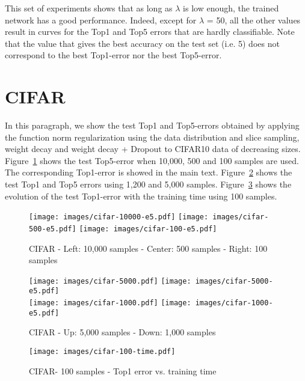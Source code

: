 \documentclass{article}
\begin{document}
This set of experiments shows that as long as $\lambda$ is low enough, the trained network has a good performance. Indeed, except for $\lambda$ = 50, all the other values result in curves for the Top1 and Top5 errors that are
hardly classifiable. Note that the value that gives the best accuracy on the test set (i.e. 5) does not correspond to the best Top1-error nor the best Top5-error.



\section{CIFAR}
In this paragraph, we show the test Top1 and Top5-errors obtained by applying the function norm regularization using the data distribution and slice sampling, weight decay and weight decay + Dropout to CIFAR10 data of decreasing sizes. 
Figure~\ref{sup-reg-im-CIFAR-e5} shows the test Top5-error when 10,000, 500 and 100 samples are used. The corresponding Top1-error is showed in the main text. Figure~\ref{sup-reg-im-CIFAR} shows the test Top1 and Top5 errors using 1,200 and 5,000 samples. Figure~\ref{t-vs-err-im-CIFAR} shows the evolution of the test Top1-error with the training time using 100 samples.
\begin{figure}[ht!]
\texttt{[image: images/cifar-10000-e5.pdf]} \hfill 
\texttt{[image: images/cifar-500-e5.pdf]} \hfill
\texttt{[image: images/cifar-100-e5.pdf]}
\caption{CIFAR - Left: 10,000 samples - Center: 500 samples - Right: 100 samples}
\label{sup-reg-im-CIFAR-e5}
\end{figure}


\begin{figure}[ht!]
\texttt{[image: images/cifar-5000.pdf]} \hfill 
\texttt{[image: images/cifar-5000-e5.pdf]} \\
\texttt{[image: images/cifar-1000.pdf]} \hfill
\texttt{[image: images/cifar-1000-e5.pdf]}
\caption{CIFAR - Up: 5,000 samples - Down: 1,000 samples}
\label{sup-reg-im-CIFAR}
\end{figure}

\begin{figure}[ht!]
\centering
\texttt{[image: images/cifar-100-time.pdf]}
\caption{CIFAR- 100 samples - Top1 error vs. training time}
\label{t-vs-err-im-CIFAR}
\end{figure}
\end{document}
